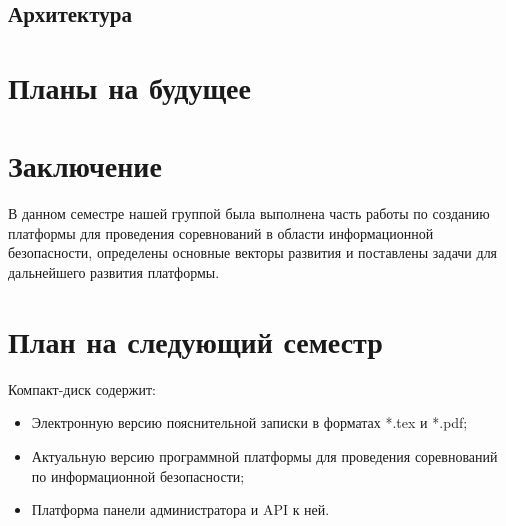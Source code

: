 \subsection{Архитектура}


\newpage
\section{Планы на будущее}


\newpage
\section*{Заключение}
В данном семестре нашей группой была выполнена часть работы по созданию платформы для проведения соревнований в области информационной безопасности, определены основные векторы развития и поставлены задачи для дальнейшего развития платформы.
 
\newpage
\section{План на следующий семестр}


\newpage
\renewcommand{\refname}{Список использованных источников}


Компакт-диск содержит: 
\begin{itemize}
\item Электронную версию пояснительной записки в форматах *.tex и *.pdf;
\item Актуальную версию программной платформы для проведения соревнований по информационной безопасности;
\item Платформа панели администратора и API к ней.
\end{itemize}
 


